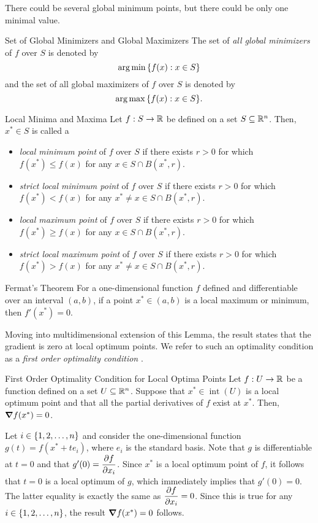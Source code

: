 \begin{rmk}
	There could be several global minimum points, but there could be only one minimal value. 	
\end{rmk}
\begin{df}{Set of Global Minimizers and Global Maximizers}
	The set of \textit{all global minimizers} of $f$ over $S$ is denoted by \[\arg\min\qty{f(x):x\in S}\] and the set of all global maximizers of $f$ over $S$ is denoted by \[\arg\max\qty{f(x):x\in S}.\]
\end{df}
\begin{df}{Local Minima and Maxima}
	Let $f:S\to{\mathbb{R}}$ be defined on a set $S\subseteq{\mathbb{R}}^n$. Then, $x^*\in S$ is called a 
	\begin{itemize}
		\item \textit{local minimum point} of $f$ over $S$ if there exists $r>0$ for which $f(x^*)\leq f(x)$ for any $x\in S\cap B(x^*, r)$.
		\item \textit{strict local minimum point} of $f$ over $S$ if there exists $r>0$ for which $f(x^*)<f(x)$ for any $x^*\neq x\in S\cap B(x^*,r)$.
		\item \textit{local maximum point} of $f$ over $S$ if there exists $r>0$ for which $f(x^*)\geq f(x)$ for any $x\in S\cap B(x^*,r)$.
		\item \textit{strict local maximum point} of $f$ over $S$ if there exists $r>0$ for which $f(x^*)>f(x)$ for any $x^*\neq x\in S\cap B(x^*, r)$.
	\end{itemize}
\end{df}
\begin{lem}{Fermat's Theorem}
	For a one-dimensional function $f$ defined and differentiable over an interval $(a,b)$, if a point $x^*\in(a,b)$ is a local maximum or minimum, then $f'(x^*)=0$.
\end{lem}
\begin{rmk}
	Moving into multidimensional extension of this Lemma, the result states that the gradient is zero at local optimum points. We refer to such an optimality condition as a \emph{first order optimality condition}	.
\end{rmk}
\begin{thm}{First Order Optimality Condition for Local Optima Points}
	Let $f:U\to{\mathbb{R}}$ be a function defined on a set $U\subseteq{\mathbb{R}}^n$. Suppose that $x^*\in\operatorname{int}(U)$ is a local optimum point and that all the partial derivatives of $f$ exist at $x^*$. Then, $\grad f(x^*)=0$.
\end{thm}
\begin{prf}
	Let $i\in\qty{1,2,\dots,n}$ and consider the one-dimensional function $g(t)=f(x^*+te_i)$, where $e_i$ is the standard basis. Note that $g$ is differentiable at $t=0$ and that $g'(0)=\displaystyle\pdv{f}{x_i} (x^*)$. Since $x^*$ is a local optimum point of $f$, it follows that $t=0$ is a local optimum of $g$, which immediately implies that $g'(0)=0$. The latter equality is exactly the same as $\displaystyle\pdv{f}{x_i} (x^*)=0$. Since this is true for any $i\in\qty{1,2,\dots,n}$, the result $\grad f(x^*)=0$ follows. 
\end{prf}

